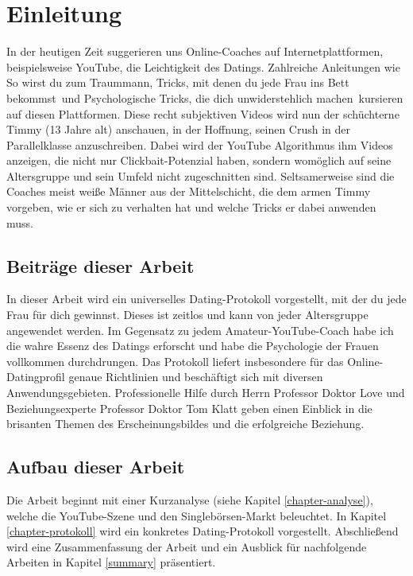 \chapter{Einleitung}
\label{chapter-einleitung}

In der heutigen Zeit suggerieren uns Online-Coaches auf Internetplattformen, beispielsweise YouTube, die Leichtigkeit des Datings.
Zahlreiche Anleitungen wie \glqq So wirst du zum Traummann\grqq, \glqq Tricks, mit denen du jede Frau ins Bett bekommst\grqq~und \glqq Psychologische Tricks, die dich unwiderstehlich machen\grqq~kursieren auf diesen Plattformen.
Diese recht subjektiven Videos wird nun der schüchterne Timmy (13 Jahre alt) anschauen, in der Hoffnung, seinen Crush in der Parallelklasse anzuschreiben.
Dabei wird der YouTube Algorithmus ihm Videos anzeigen, die nicht nur Clickbait-Potenzial haben, sondern womöglich auf seine Altersgruppe und sein Umfeld nicht zugeschnitten sind.
Seltsamerweise sind die Coaches meist weiße Männer aus der Mittelschicht, die dem armen Timmy vorgeben, wie er sich zu verhalten hat und welche Tricks er dabei anwenden muss.




\section{Beiträge dieser Arbeit}

In dieser Arbeit wird ein universelles Dating-Protokoll vorgestellt, mit der du jede Frau für dich gewinnst.
Dieses ist zeitlos und kann von jeder Altersgruppe angewendet werden.
Im Gegensatz zu jedem Amateur-YouTube-Coach habe ich die wahre Essenz des Datings erforscht und habe die Psychologie der Frauen vollkommen durchdrungen.
Das Protokoll liefert insbesondere für das Online-Datingprofil genaue Richtlinien und beschäftigt sich mit diversen Anwendungsgebieten.
Professionelle Hilfe durch Herrn Professor Doktor Love und Beziehungsexperte Professor Doktor Tom Klatt geben einen Einblick in die brisanten Themen des Erscheinungsbildes und die erfolgreiche Beziehung.



\section{Aufbau dieser Arbeit}

Die Arbeit beginnt mit einer Kurzanalyse (siehe Kapitel \ref{chapter-analyse}), welche die YouTube-Szene und den Singlebörsen-Markt beleuchtet.
In Kapitel \ref{chapter-protokoll} wird ein konkretes Dating-Protokoll vorgestellt.
Abschließend wird eine Zusammenfassung der Arbeit und ein Ausblick für nachfolgende Arbeiten in Kapitel \ref{summary} präsentiert.